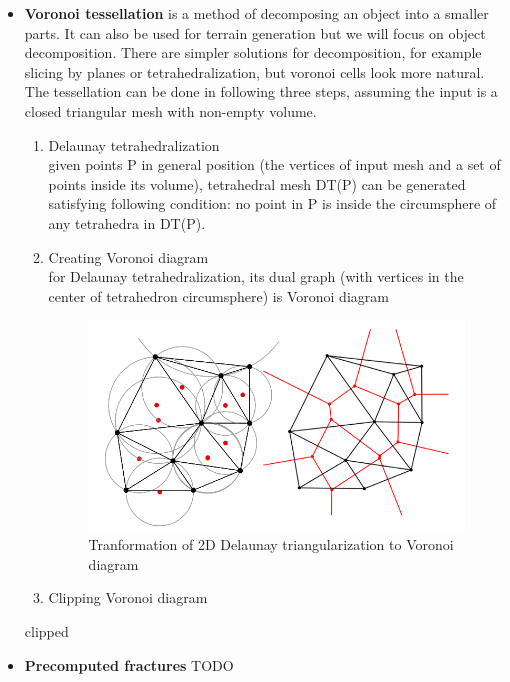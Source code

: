 \begin{itemize}
\item \textbf{Voronoi tessellation} is a method of decomposing an object into a smaller parts. It can also be used for terrain generation but we will focus on object decomposition. There are simpler solutions for decomposition, for example slicing by planes or tetrahedralization, but voronoi cells look more natural. The tessellation can be done in following three steps, assuming the input is a closed triangular mesh with non-empty volume.
\begin{enumerate}
	\item Delaunay tetrahedralization \\ given points P in general position (the vertices of input mesh and a set of points inside its volume), tetrahedral mesh DT(P) can be generated satisfying following condition: no point in P is inside the circumsphere of any tetrahedra in DT(P).
    \item Creating Voronoi diagram \\ for Delaunay tetrahedralization, its dual graph (with vertices in the center of tetrahedron circumsphere) is Voronoi diagram
    \begin{figure}[h!]
		\label{DT}
        \includegraphics[width=\textwidth]{img/voro}
		\caption{Tranformation of 2D Delaunay triangularization to Voronoi diagram}
	\end{figure}
    \item Clipping Voronoi diagram
    
\end{enumerate}

clipped \cite{yan2010efficient}

\item \textbf{Precomputed fractures} TODO

\end{itemize}



